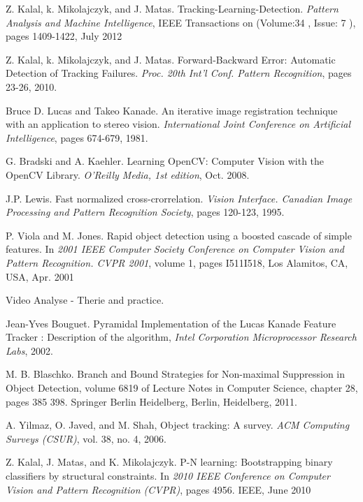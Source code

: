 \listoffigures

\newpage{}

\begin{thebibliography}{SMAT}
 Z. Kalal, k. Mikolajczyk, and J. Matas. Tracking-Learning-Detection. \textit{Pattern Analysis and Machine Intelligence}, IEEE Transactions on (Volume:34 , Issue: 7 ), pages 1409-1422, July 2012

 Z. Kalal, k. Mikolajczyk, and J. Matas. Forward-Backward Error: Automatic Detection of Tracking Failures. \textit{Proc. 20th Int'l Conf. Pattern Recognition}, pages 23-26, 2010.

 Bruce D. Lucas and Takeo Kanade. An iterative image registration technique with an application to stereo vision. \textit{International Joint Conference on Artificial Intelligence}, pages 674-679, 1981.

G. Bradski and A. Kaehler. Learning OpenCV: Computer Vision with the OpenCV Library.\textit{ O\textquoteright{}Reilly Media, 1st edition}, Oct. 2008.

 J.P. Lewis. Fast normalized cross-crorrelation. \textit{Vision Interface. Canadian Image Processing and Pattern Recognition Society}, pages 120-123, 1995.

P. Viola and M. Jones. Rapid object detection using a boosted cascade of simple features. In \textit{2001 IEEE Computer Society Conference on Computer Vision and Pattern Recognition. CVPR 2001}, volume 1, pages I\textendash{}511\textendash{}I\textendash{}518, Los Alamitos, CA, USA, Apr. 2001

 Video Analyse - Therie and practice.

 Jean-Yves Bouguet. Pyramidal Implementation of the Lucas Kanade Feature Tracker : Description of the algorithm, \textit{Intel Corporation \textendash{} Microprocessor Research Labs}, 2002.

 M. B. Blaschko. Branch and Bound Strategies for Non-maximal Suppression in Object Detection, volume 6819 of Lecture Notes in Computer Science, chapter 28, pages 385\textendash{} 398. Springer Berlin Heidelberg, Berlin, Heidelberg, 2011.

 A. Yilmaz, O. Javed, and M. Shah, Object tracking: A survey. \textit{ACM Computing Surveys (CSUR)}, vol. 38, no. 4, 2006.

Z. Kalal, J. Matas, and K. Mikolajczyk. P-N learning: Bootstrapping binary classifiers by structural constraints. In \textit{2010 IEEE Conference on Computer Vision and Pattern Recognition (CVPR)}, pages 49\textendash{}56. IEEE, June 2010


\end{thebibliography}
